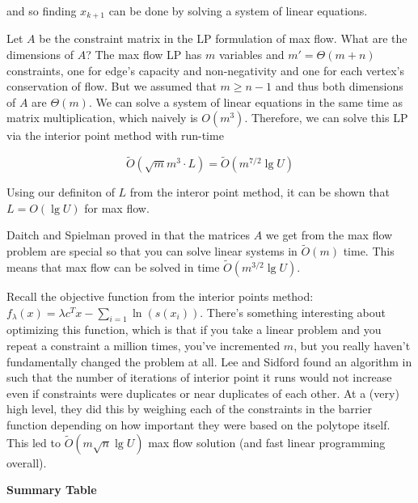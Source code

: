 \documentclass[11pt]{article}
\begin{document}
and so finding $x_{k+1}$ can be done by solving a system of linear equations. 

Let $A$ be the constraint matrix in the LP formulation of max flow. What are the dimensions of $A$? The max flow LP has $m$ variables and $m' = \Theta(m+n)$ constraints, one for edge's capacity and non-negativity and one for each vertex's conservation of flow. But we assumed that $m \geq n-1$ and thus both dimensions of $A$ are $\Theta(m)$. We can solve a system of linear equations in the same time as matrix multiplication, which naively is $O(m^3)$. Therefore, we can solve this LP via the interior point method with run-time

$$\tilde{O}(\sqrt{m} m^3 \cdot L) = \tilde{O}(m^{7/2} \lg U)$$ 

Using our definiton of $L$ from the interor point method, it can be shown that $L = O(\lg U)$ for max flow.

Daitch and Spielman proved in \cite{Daitch} that the matrices $A$ we get from the max flow problem are special so that you can solve linear systems in $\tilde{O}(m)$ time. This means that max flow can be solved in time $\tilde{O}(m^{3/2} \lg U)$. 


Recall the objective function from the interior points method: $f_\lambda(x) = \lambda c^T x - \sum_{i=1} \ln (s(x_i))$. There's something interesting about optimizing this function, which is that if you take a linear problem and you repeat a constraint a million times, you've incremented $m$, but you really haven't fundamentally changed the problem at all. Lee and Sidford found an algorithm in \cite{Lee} such that the number of iterations of interior point it runs would not increase even if constraints were duplicates or near duplicates of each other. At a (very) high level, they did this by weighing each of the constraints in the barrier function depending on how important they were based on the polytope itself. This led to $\tilde{O}( m \sqrt{n} \lg U)$ max flow solution (and fast linear programming overall).

\textbf{Summary Table}
\end{document}
